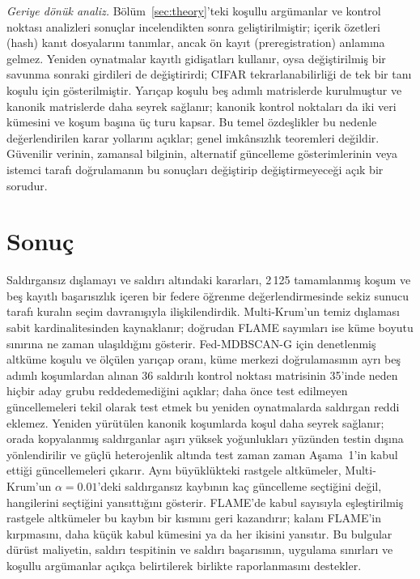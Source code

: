 \documentclass[journal]{IEEEtran}
\newcommand{\method}{Fed-MDBSCAN-G}
\begin{document}
\emph{Geriye dönük analiz.} Bölüm~\ref{sec:theory}'teki koşullu argümanlar ve kontrol noktası analizleri sonuçlar incelendikten sonra geliştirilmiştir; içerik özetleri (hash) kanıt dosyalarını tanımlar, ancak ön kayıt (preregistration) anlamına gelmez. Yeniden oynatmalar kayıtlı gidişatları kullanır, oysa değiştirilmiş bir savunma sonraki girdileri de değiştirirdi; CIFAR tekrarlanabilirliği de tek bir tanı koşulu için gösterilmiştir. Yarıçap koşulu beş adımlı matrislerde kurulmuştur ve kanonik matrislerde daha seyrek sağlanır; kanonik kontrol noktaları da iki veri kümesini ve koşum başına üç turu kapsar. Bu temel özdeşlikler bu nedenle değerlendirilen karar yollarını açıklar; genel imkânsızlık teoremleri değildir. Güvenilir verinin, zamansal bilginin, alternatif güncelleme gösterimlerinin veya istemci tarafı doğrulamanın bu sonuçları değiştirip değiştirmeyeceği açık bir sorudur.

\section{Sonuç}\label{sec:conclusion}
Saldırgansız dışlamayı ve saldırı altındaki kararları, 2\,125 tamamlanmış koşum ve beş kayıtlı başarısızlık içeren bir federe öğrenme değerlendirmesinde sekiz sunucu tarafı kuralın seçim davranışıyla ilişkilendirdik. Multi-Krum'un temiz dışlaması sabit kardinalitesinden kaynaklanır; doğrudan FLAME sayımları ise küme boyutu sınırına ne zaman ulaşıldığını gösterir. \method{} için denetlenmiş altküme koşulu ve ölçülen yarıçap oranı, küme merkezi doğrulamasının ayrı beş adımlı koşumlardan alınan 36 saldırılı kontrol noktası matrisinin 35'inde neden hiçbir aday grubu reddedemediğini açıklar; daha önce test edilmeyen güncellemeleri tekil olarak test etmek bu yeniden oynatmalarda saldırgan reddi eklemez. Yeniden yürütülen kanonik koşumlarda koşul daha seyrek sağlanır; orada kopyalanmış saldırganlar aşırı yüksek yoğunlukları yüzünden testin dışına yönlendirilir ve güçlü heterojenlik altında test zaman zaman Aşama~1'in kabul ettiği güncellemeleri çıkarır. Aynı büyüklükteki rastgele altkümeler, Multi-Krum'un $\alpha=0.01$'deki saldırgansız kaybının kaç güncelleme seçtiğini değil, hangilerini seçtiğini yansıttığını gösterir. FLAME'de kabul sayısıyla eşleştirilmiş rastgele altkümeler bu kaybın bir kısmını geri kazandırır; kalanı FLAME'in kırpmasını, daha küçük kabul kümesini ya da her ikisini yansıtır. Bu bulgular dürüst maliyetin, saldırı tespitinin ve saldırı başarısının, uygulama sınırları ve koşullu argümanlar açıkça belirtilerek birlikte raporlanmasını destekler.
\end{document}
